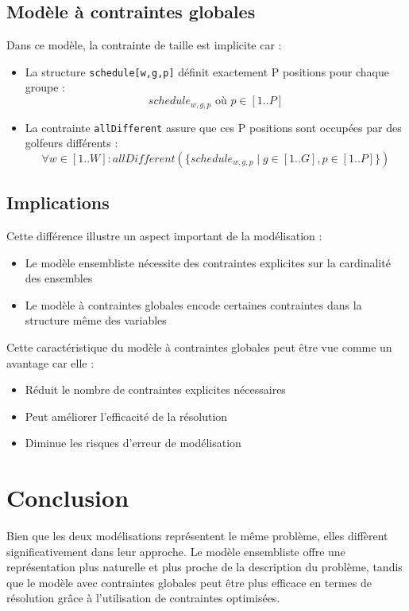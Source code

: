 \documentclass{article}
\begin{document}
\subsection{Modèle à contraintes globales}
Dans ce modèle, la contrainte de taille est implicite car :

\begin{itemize}
   \item La structure \texttt{schedule[w,g,p]} définit exactement P positions pour chaque groupe :
   \[
   schedule_{w,g,p} \text{ où } p \in [1..P]
   \]
   
   \item La contrainte \texttt{allDifferent} assure que ces P positions sont occupées par des golfeurs différents :
   \[
   \forall w \in [1..W] : allDifferent(\{schedule_{w,g,p} \mid g \in [1..G], p \in [1..P]\})
   \]
\end{itemize}

\subsection{Implications}
Cette différence illustre un aspect important de la modélisation :
\begin{itemize}
   \item Le modèle ensembliste nécessite des contraintes explicites sur la cardinalité des ensembles
   \item Le modèle à contraintes globales encode certaines contraintes dans la structure même des variables
\end{itemize}

Cette caractéristique du modèle à contraintes globales peut être vue comme un avantage car elle :
\begin{itemize}
   \item Réduit le nombre de contraintes explicites nécessaires
   \item Peut améliorer l'efficacité de la résolution
   \item Diminue les risques d'erreur de modélisation
\end{itemize}

\section{Conclusion}
Bien que les deux modélisations représentent le même problème, elles diffèrent significativement dans leur approche. Le modèle ensembliste offre une représentation plus naturelle et plus proche de la description du problème, tandis que le modèle avec contraintes globales peut être plus efficace en termes de résolution grâce à l'utilisation de contraintes optimisées.
\end{document}

